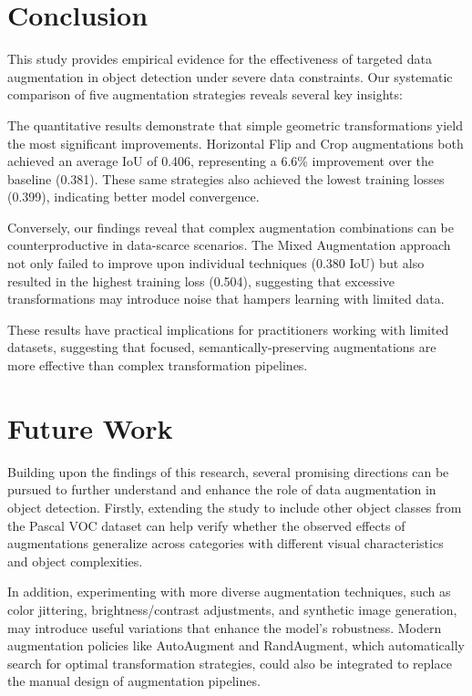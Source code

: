 \documentclass[12pt]{article}
\begin{document}
\section{Conclusion}
This study provides empirical evidence for the effectiveness of targeted data augmentation in object detection under severe data constraints. Our systematic comparison of five augmentation strategies reveals several key insights:

The quantitative results demonstrate that simple geometric transformations yield the most significant improvements. Horizontal Flip and Crop augmentations both achieved an average IoU of 0.406, representing a 6.6\% improvement over the baseline (0.381). These same strategies also achieved the lowest training losses (0.399), indicating better model convergence.

Conversely, our findings reveal that complex augmentation combinations can be counterproductive in data-scarce scenarios. The Mixed Augmentation approach not only failed to improve upon individual techniques (0.380 IoU) but also resulted in the highest training loss (0.504), suggesting that excessive transformations may introduce noise that hampers learning with limited data.

These results have practical implications for practitioners working with limited datasets, suggesting that focused, semantically-preserving augmentations are more effective than complex transformation pipelines.

\section{Future Work}

Building upon the findings of this research, several promising directions can be pursued to further understand and enhance the role of data augmentation in object detection. Firstly, extending the study to include other object classes from the Pascal VOC dataset can help verify whether the observed effects of augmentations generalize across categories with different visual characteristics and object complexities.

In addition, experimenting with more diverse augmentation techniques, such as color jittering, brightness/contrast adjustments, and synthetic image generation, may introduce useful variations that enhance the model's robustness. Modern augmentation policies like AutoAugment and RandAugment, which automatically search for optimal transformation strategies, could also be integrated to replace the manual design of augmentation pipelines.
\end{document}

